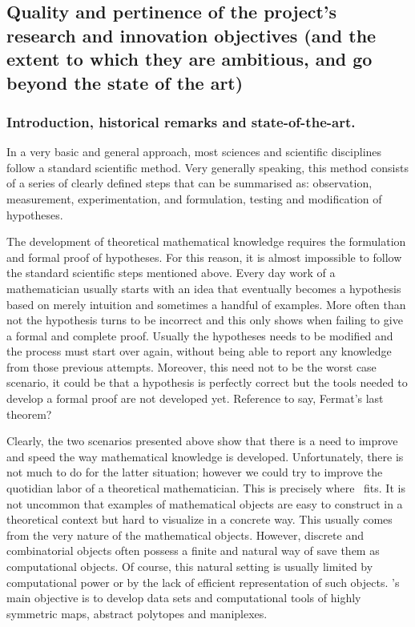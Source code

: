 \subsection{Quality and pertinence of the project’s research and innovation objectives (and the extent to which they are ambitious, and go beyond the state of the art)}
\label{sec:quality}

\subsubsection*{Introduction, historical remarks and state-of-the-art.}%

In a very basic and general approach, most sciences and scientific disciplines follow a standard scientific method. Very generally speaking, this method consists of a series of clearly defined steps that can be summarised  as:  observation, measurement, experimentation, and formulation, testing and modification of hypotheses.

The development of theoretical mathematical knowledge requires the formulation  and formal proof of hypotheses.
For this reason, it is almost impossible to follow the standard scientific steps mentioned above.
Every day work of a mathematician usually starts with an idea that eventually becomes a hypothesis based on merely intuition and sometimes a handful of examples. More often than not the hypothesis turns to be incorrect and this only shows when failing to give a formal and complete proof.
Usually the hypotheses needs to be modified and the process must start over again, without being able to report any knowledge from those previous attempts.
Moreover, this need not to be the worst case scenario, it could be that a hypothesis is perfectly correct but the tools needed  to develop a formal proof are not developed yet. Reference to say, Fermat’s last theorem?

Clearly, the two scenarios presented above show that there is a need to improve and speed the way mathematical knowledge is developed. Unfortunately, there is not much to do for the latter situation; however we could try to improve the quotidian labor of a theoretical mathematician.
This is precisely where \ourp\ fits.
It is not uncommon that examples of mathematical objects are easy to construct in a theoretical context but hard to visualize in a concrete way.
This usually comes from the very nature of the mathematical objects.
However, discrete and combinatorial objects often possess a finite and natural way of save them as computational objects.
Of course, this natural setting is usually limited by computational power or by the lack of efficient representation of such objects.
\ourp's main objective is to develop data sets and computational tools of highly symmetric maps, abstract polytopes and maniplexes.

